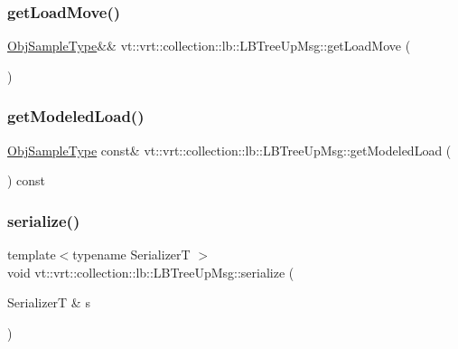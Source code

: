 \subsubsection{\texorpdfstring{get\+Load\+Move()}{getLoadMove()}}
{\footnotesize\ttfamily \hyperlink{structvt_1_1vrt_1_1collection_1_1lb_1_1_hier_l_b_types_a597a60d517207b90e8c7984eac434e8f}{Obj\+Sample\+Type}\&\& vt\+::vrt\+::collection\+::lb\+::\+L\+B\+Tree\+Up\+Msg\+::get\+Load\+Move (\begin{DoxyParamCaption}{ }\end{DoxyParamCaption})\hspace{0.3cm}{\ttfamily [inline]}}

\mbox{\label{structvt_1_1vrt_1_1collection_1_1lb_1_1_l_b_tree_up_msg_a2ab64313485fc6b4b091c1a7a0b94aa1}} 
\subsubsection{\texorpdfstring{get\+Modeled\+Load()}{getModeledLoad()}}
{\footnotesize\ttfamily \hyperlink{structvt_1_1vrt_1_1collection_1_1lb_1_1_hier_l_b_types_a597a60d517207b90e8c7984eac434e8f}{Obj\+Sample\+Type} const\& vt\+::vrt\+::collection\+::lb\+::\+L\+B\+Tree\+Up\+Msg\+::get\+Modeled\+Load (\begin{DoxyParamCaption}{ }\end{DoxyParamCaption}) const\hspace{0.3cm}{\ttfamily [inline]}}

\mbox{\label{structvt_1_1vrt_1_1collection_1_1lb_1_1_l_b_tree_up_msg_a6d948678b6361cbaa753d878b72fbce8}} 
\subsubsection{\texorpdfstring{serialize()}{serialize()}}
{\footnotesize\ttfamily template$<$typename SerializerT $>$ \\
void vt\+::vrt\+::collection\+::lb\+::\+L\+B\+Tree\+Up\+Msg\+::serialize (\begin{DoxyParamCaption}\item[{SerializerT \&}]{s }\end{DoxyParamCaption})\hspace{0.3cm}{\ttfamily [inline]}}

